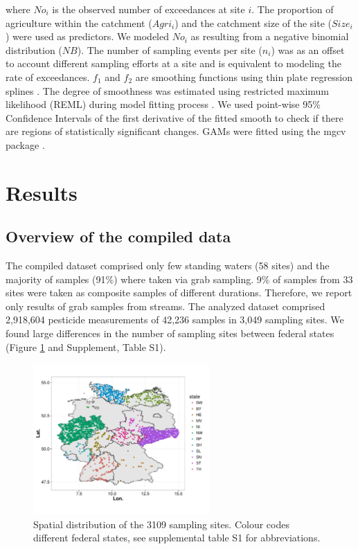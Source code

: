 \documentclass[journal=esthag,manuscript=article]{achemso}
\begin{document}
where $No_i$ is the observed number of exceedances at site $i$. 
The proportion of agriculture within the catchment ($Agri_i$) and the catchment size of the site ($Size_i$) were used as predictors. 
We modeled $No_i$ as resulting from a negative binomial distribution ($NB$).
The number of sampling events per site ($n_i$) was as an offset to account different sampling efforts at a site and is equivalent to modeling the rate of exceedances. 
$f_1$ and $f_2$ are smoothing functions using thin plate regression splines \citep{wood_thin_2003}.
The degree of smoothness was estimated using restricted maximum likelihood (REML) during model fitting process \citep{wood_fast_2011}.
We used point-wise 95\% Confidence Intervals of the first derivative of the fitted smooth to check if there are regions of statistically significant changes.
GAMs were fitted using the mgcv package \citep{wood_fast_2011}.



\section{Results}
\subsection{Overview of the compiled data}

The compiled dataset comprised only few standing waters (58 sites) and the majority of samples (91\%) where taken via grab sampling.  %
9\% of samples from 33 sites were taken as composite samples of different durations.
Therefore, we report only results of grab samples from streams. 
The analyzed dataset comprised 2,918,604 pesticide measurements of 42,236 samples in 3,049 sampling sites.  %
We found large differences in the number of sampling sites between federal states (Figure \ref{fig:fig1} and Supplement, Table S1).

\begin{figure}[ht]
  \includegraphics[width=0.6\textwidth]{figure1.pdf}
  \caption{Spatial distribution of the 3109 sampling sites. Colour codes different federal states, see supplemental table S1 for abbreviations.}
  \label{fig:fig1}
\end{figure}
\end{document}
